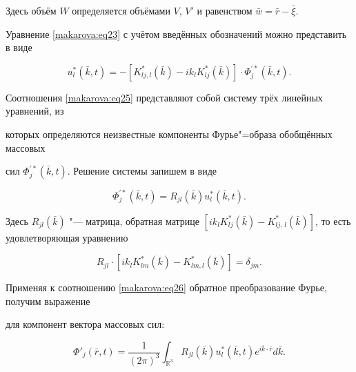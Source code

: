 Здесь объём $W$ определяется объёмами $V$, ${V}'$ и равенством $\bar {w}=\bar

{r}-\bar {\xi }$.



Уравнение \eqref{makarova:eq23} с учётом введённых обозначений можно представить в виде

\begin{equation}

\label{makarova:eq25}

u_l^\ast (\bar {k} , t)=-\left[K_{lj,l}^\ast (\bar {k})-ik_l K_{lj}^\ast (\bar {k})

\right] \cdot \Phi^{'\ast}_j (\bar {k} , t).

\end{equation}



Соотношения \eqref{makarova:eq25} представляют собой систему трёх линейных уравнений, из

которых определяются неизвестные компоненты Фурье"=образа обобщённых массовых

сил $\Phi^{'\ast}_j (\bar {k} , t)$. Решение системы запишем в виде

\begin{equation}

\label{makarova:eq26}

\Phi^{'\ast}_j (\bar {k} , t)=R_{jl} (\bar

{k}) u_l^\ast (\bar {k} , t).

\end{equation}

Здесь $R_{jl} (\bar {k})$ "--- матрица, обратная матрице $\left[ik_l

K_{lj}^{\ast} (\bar {k})-K_{lj,\,l}^\ast (\bar {k}) \right]$, то есть удовлетворяющая уравнению

\begin{equation}

\label{makarova:eq27}

R_{jl} \cdot \left[ik_l K_{lm}^\ast(\bar {k})-K_{lm,l}^\ast (\bar {k})\right]= \delta_{jm}.

\end{equation}

Применяя к соотношению \eqref{makarova:eq26} обратное преобразование Фурье, получим выражение

для компонент вектора массовых сил:

\begin{equation}

\label{makarova:eq28}

\Phi'_j (\bar {r} , t)=\frac{1}{(2\pi)^3}\int_{\mathbb R^3} R_{jl} (\bar {k})u_l^\ast (\bar

{k},t)e^{i\bar {k}\cdot \bar {r}}d\bar {k}.

\end{equation}



